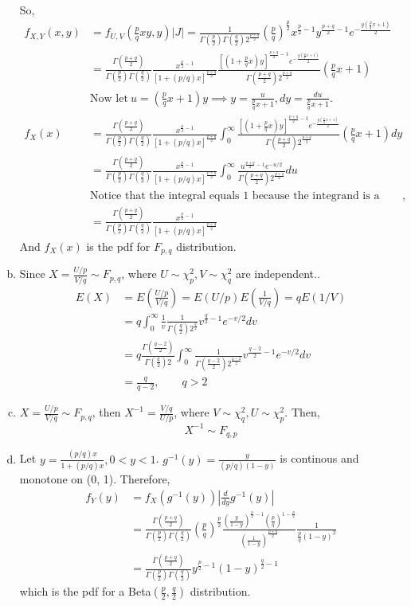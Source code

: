 \documentclass[letterpaper]{article}
\newcommand{\intzi}{\int_0^\infty}
\newcommand{\pbt}{\frac{p}{2}}
\newcommand{\qbt}{\frac{q}{2}}
\newcommand{\pqbt}{\frac{p+q}{2}}
\begin{document}
\begin{enumerate}[(a)]
So, 
\begin{align*}
f_{X,Y}(x, y) & = f_{U, V}(\frac{p}{q} xy, y) |J| = \frac{1}{\Gamma(\pbt)\Gamma(\qbt)2^{\pqbt}} (\frac{p}{q})^{\pbt} x^{\pbt - 1} y^{\pqbt-1} e^{-\frac{y(\frac{p}{q} x +1)}{2}} \\
& = \frac{\Gamma(\pqbt)}{\Gamma(\pbt)\Gamma(\qbt)} \frac{x^{\pbt-1}}{[1+(p/q)x]^{\pqbt}} \frac{[(1+\frac{p}{q}x)y]^{\pqbt-1} e^{-\frac{y(\frac{p}{q} x +1)}{2}}}{\Gamma(\pqbt)2^{\pqbt}} (\frac{p}{q} x+ 1) \\
& \text{Now let}~u = (\frac{p}{q} x + 1)y \implies y = \frac{u}{\frac{p}{q} x + 1}, dy = \frac{du}{\frac{p}{q} x + 1}.\\
f_X(x) & = \frac{\Gamma(\pqbt)}{\Gamma(\pbt)\Gamma(\qbt)} \frac{x^{\pbt-1}}{[1+(p/q)x]^{\pqbt}} \intzi \frac{[(1+\frac{p}{q}x)y]^{\pqbt-1} e^{-\frac{y(\frac{p}{q} x +1)}{2}}}{\Gamma(\pqbt)2^{\pqbt}} (\frac{p}{q} x+ 1) dy \\
& = \frac{\Gamma(\pqbt)}{\Gamma(\pbt)\Gamma(\qbt)} \frac{x^{\pbt-1}}{[1+(p/q)x]^{\pqbt}} \intzi \frac{u^{\pqbt-1} e^{-u/2}}{\Gamma(\pqbt)2^{\pqbt}} du \\
& \text{Notice that the integral equals 1 because the integrand is a gamma pdf},\\
& = \frac{\Gamma(\pqbt)}{\Gamma(\pbt)\Gamma(\qbt)} \frac{x^{\pbt-1}}{[1+(p/q)x]^{\pqbt}}
\end{align*}
And $f_X(x)$ is the pdf for $F_{p, q}$ distribution.
\item
Since $X = \frac{U/p}{V/q} \sim F_{p, q}$, where $U \sim \chi^2_p, V \sim \chi^2_q$ are independent..
\begin{align*}
E(X) & = E(\frac{U/p}{V/q}) = E(U/p) E(\frac{1}{V/q}) = q E(1/V) \\
& = q \intzi \frac{1}{v} \frac{1}{\Gamma(\qbt)2^{\qbt}} v^{\qbt-1} e^{-v/2} dv\\
& = q \frac{\Gamma(\frac{q-2}{2})}{\Gamma(\frac{q}{2}) 2} \intzi \frac{1}{\Gamma(\frac{q-2}{2}) 2^{\frac{q-2}{2}}} v^{\frac{q-2}{2} -1} e^{-v/2} dv \\
& = \frac{q}{q-2}, \qquad q > 2
\end{align*}
\item $X = \frac{U/p}{V/q} \sim F_{p, q}$, then $X^{-1} = \frac{V/q}{U/p}$, where $V \sim \chi^2_q, U \sim \chi^2_p$. Then,
\[
X^{-1} \sim F_{q, p}
\]
\item
Let $y = \frac{(p/q)x}{1+(p/q)x}, 0 < y < 1$. $g^{-1}(y) = \frac{y}{(p/q)(1-y)}$ is continous and monotone on (0, 1). Therefore,
\begin{align*}
f_Y(y) & = f_X(g^{-1}(y)) \left|\frac{d}{dy} g^{-1}(y)\right| \\
& = \frac{\Gamma(\pqbt)}{\Gamma(\pbt)\Gamma(\qbt)} (\frac{p}{q})^{\pbt} \frac{\left(\frac{y}{1-y}\right)^{\pbt-1} \left(\frac{p}{q}\right)^{1-\pbt}}{\left(\frac{1}{1-y}\right)^{\pqbt}} \frac{1}{\frac{p}{q} (1-y)^2} \\
& = \frac{\Gamma(\pqbt)}{\Gamma(\pbt)\Gamma(\qbt)} y^{\pbt-1} (1-y)^{\qbt-1}
\end{align*}
which is the pdf for a Beta$(\pbt, \qbt)$ distribution.

\end{enumerate}
\end{document}
